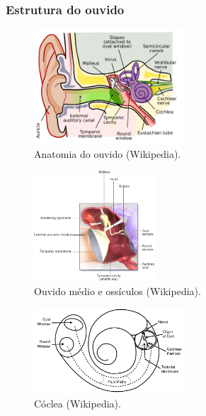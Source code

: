 \begin{frame}[allowframebreaks]
  \frametitle{Estrutura do ouvido}

  \begin{figure}[h]
  \centering
  \includegraphics[width=0.5\textwidth]{images/humanear.pdf}
  \caption{Anatomia do ouvido (Wikipedia).}
  \label{fig-humanear}
  \end{figure}

  \framebreak

  \begin{figure}[h]
  \centering
  \includegraphics[width=0.4\textwidth]{images/middleear.png}
  \caption{Ouvido médio e ossículos (Wikipedia).}
  \label{fig-middleear}
  \end{figure}

  \framebreak

  \begin{figure}[h]
  \centering
  \includegraphics[width=0.5\textwidth]{images/cochlea.pdf}
  \caption{Cóclea (Wikipedia).}
  \label{fig-cochlea}
  \end{figure}

  \framebreak


\end{frame}

